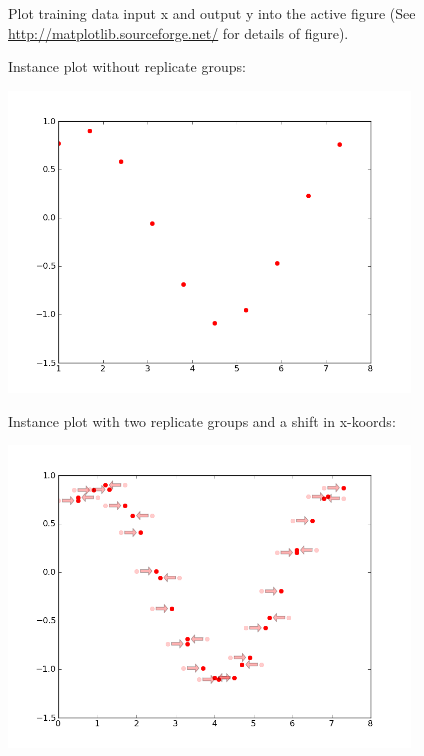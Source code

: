 \documentclass[letterpaper,10pt,english]{sphinxmanual}
\begin{document}

\begin{fulllineitems}
\label{plot_gpr:pygp.plot.gpr_plot.plot_training_data}
Plot training data input x and output y into the
active figure (See \href{http://matplotlib.sourceforge.net/}{http://matplotlib.sourceforge.net/} for details of figure).

Instance plot without replicate groups:

\includegraphics[height=8cm]{plotTraining.png}

Instance plot with two replicate groups and a shift in x-koords:

\includegraphics[height=8cm]{plotTrainingShiftX.png}


\end{fulllineitems}
\end{document}
